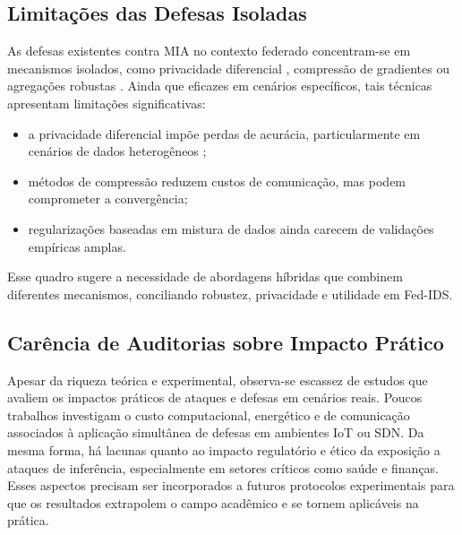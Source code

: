 \documentclass[
	12pt,				%
	openright,			%
	oneside,			%
	a4paper,			%
	english,			%
	french,				%
	spanish,			%
	brazil,				%
	]{abntex2}
\begin{document}
\subsection{Limitações das Defesas Isoladas}
As defesas existentes contra MIA no contexto federado concentram-se em mecanismos isolados, como privacidade diferencial \cite{abadi2016dpsgd}, compressão de gradientes \cite{wu2023pruningfl,wei2024gradientsparsification} ou agregações robustas \cite{yin2024miafl}. Ainda que eficazes em cenários específicos, tais técnicas apresentam limitações significativas:
\begin{itemize}
    \item a privacidade diferencial impõe perdas de acurácia, particularmente em cenários de dados heterogêneos \cite{bagdasaryan2019dpimpact};
    \item métodos de compressão reduzem custos de comunicação, mas podem comprometer a convergência;
    \item regularizações baseadas em mistura de dados ainda carecem de validações empíricas amplas.
\end{itemize}
Esse quadro sugere a necessidade de abordagens híbridas que combinem diferentes mecanismos, conciliando robustez, privacidade e utilidade em Fed-IDS.

\subsection{Carência de Auditorias sobre Impacto Prático}
Apesar da riqueza teórica e experimental, observa-se escassez de estudos que avaliem os impactos práticos de ataques e defesas em cenários reais. Poucos trabalhos investigam o custo computacional, energético e de comunicação associados à aplicação simultânea de defesas em ambientes IoT ou SDN. Da mesma forma, há lacunas quanto ao impacto regulatório e ético da exposição a ataques de inferência, especialmente em setores críticos como saúde e finanças. Esses aspectos precisam ser incorporados a futuros protocolos experimentais para que os resultados extrapolem o campo acadêmico e se tornem aplicáveis na prática.
\end{document}
